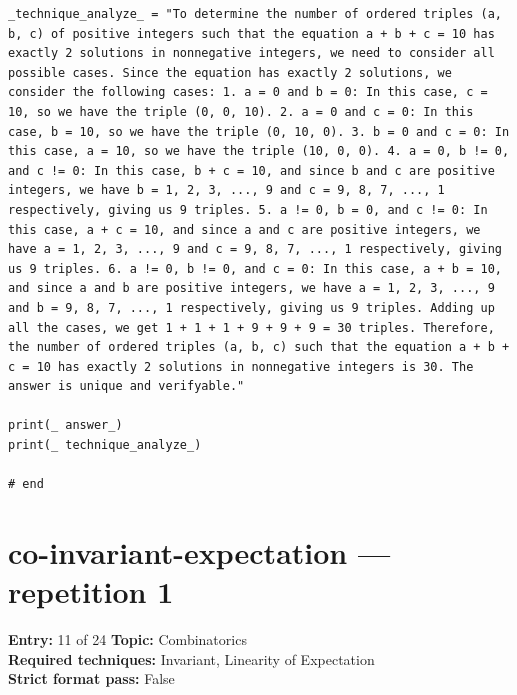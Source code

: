 \documentclass[11pt]{article}
\begin{document}
\begin{lstlisting}[style=modeloutput]
_technique_analyze_ = "To determine the number of ordered triples (a, b, c) of positive integers such that the equation a + b + c = 10 has exactly 2 solutions in nonnegative integers, we need to consider all possible cases. Since the equation has exactly 2 solutions, we consider the following cases: 1. a = 0 and b = 0: In this case, c = 10, so we have the triple (0, 0, 10). 2. a = 0 and c = 0: In this case, b = 10, so we have the triple (0, 10, 0). 3. b = 0 and c = 0: In this case, a = 10, so we have the triple (10, 0, 0). 4. a = 0, b != 0, and c != 0: In this case, b + c = 10, and since b and c are positive integers, we have b = 1, 2, 3, ..., 9 and c = 9, 8, 7, ..., 1 respectively, giving us 9 triples. 5. a != 0, b = 0, and c != 0: In this case, a + c = 10, and since a and c are positive integers, we have a = 1, 2, 3, ..., 9 and c = 9, 8, 7, ..., 1 respectively, giving us 9 triples. 6. a != 0, b != 0, and c = 0: In this case, a + b = 10, and since a and b are positive integers, we have a = 1, 2, 3, ..., 9 and b = 9, 8, 7, ..., 1 respectively, giving us 9 triples. Adding up all the cases, we get 1 + 1 + 1 + 9 + 9 + 9 = 30 triples. Therefore, the number of ordered triples (a, b, c) such that the equation a + b + c = 10 has exactly 2 solutions in nonnegative integers is 30. The answer is unique and verifyable."

print(_ answer_)
print(_ technique_analyze_)

# end
\end{lstlisting}
\clearpage
\section{co-invariant-expectation --- repetition 1}
\begin{minipage}{\textwidth}
\color{metadata}\small\raggedright
\textbf{Entry:} 11 of 24\quad
\textbf{Topic:} Combinatorics\\[2pt]
\textbf{Required techniques:} Invariant, Linearity of Expectation\\[2pt]
\textbf{Strict format pass:} False
\end{minipage}
\end{document}
